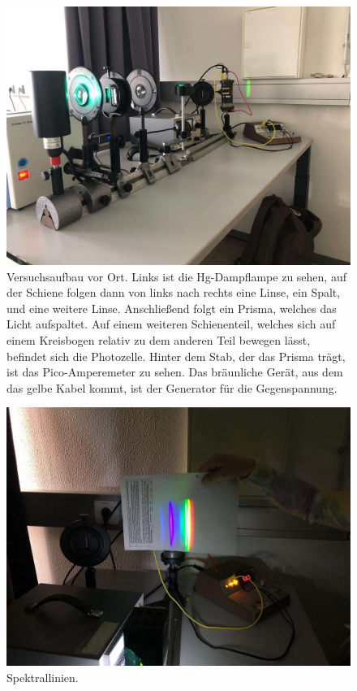 \begin{figure}
    \centering
    \includegraphics[width =\textwidth]{content/aufbaufotot.pdf}
    \caption{Versuchsaufbau vor Ort. Links ist die Hg-Dampflampe zu sehen, auf der Schiene folgen dann von links nach rechts eine Linse, ein Spalt, und eine weitere Linse.
    Anschließend folgt ein Prisma, welches das Licht aufspaltet.
    Auf einem weiteren Schienenteil, welches sich auf einem Kreisbogen relativ zu dem anderen Teil bewegen lässt, befindet sich die Photozelle.
    Hinter dem Stab, der das Prisma trägt, ist das Pico-Amperemeter zu sehen.
    Das bräunliche Gerät, aus dem das gelbe Kabel kommt, ist der Generator für die Gegenspannung.}
    \label{fig:aufbau}
\end{figure}

\begin{figure}
    \centering
    \includegraphics[width =\textwidth]{content/farben.pdf}
    \caption{Spektrallinien.}
    \label{fig:farben}
\end{figure}